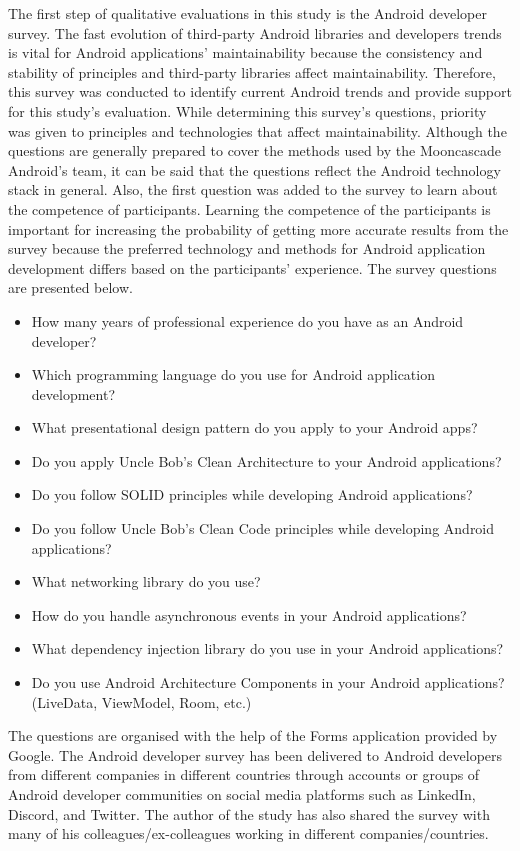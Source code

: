 The first step of qualitative evaluations in this study is the Android developer survey. The fast evolution of third-party Android libraries and developers trends is vital for Android applications' maintainability because the consistency and stability of principles and third-party libraries affect maintainability. Therefore, this survey was conducted to identify current Android trends and provide support for this study's evaluation. While determining this survey's questions, priority was given to principles and technologies that affect maintainability. Although the questions are generally prepared to cover the methods used by the Mooncascade Android's team, it can be said that the questions reflect the Android technology stack in general. Also, the first question was added to the survey to learn about the competence of participants. Learning the competence of the participants is important for increasing the probability of getting more accurate results from the survey because the preferred technology and methods for Android application development differs based on the participants’ experience. The survey questions are presented below. 
\begin{itemize}
    \item How many years of professional experience do you have as an Android developer?
    \item Which programming language do you use for Android application development?
    \item What presentational design pattern do you apply to your Android apps?
    \item Do you apply Uncle Bob's Clean Architecture to your Android applications?
    \item Do you follow SOLID principles while developing Android applications?
    \item Do you follow Uncle Bob's Clean Code principles while developing Android applications?
    \item What networking library do you use?
    \item How do you handle asynchronous events in your Android applications?
    \item What dependency injection library do you use in your Android applications?
    \item Do you use Android Architecture Components in your Android applications? (LiveData, ViewModel, Room, etc.)
\end{itemize}
The questions are organised with the help of the Forms application provided by Google. The Android developer survey has been delivered to Android developers from different companies in different countries through accounts or groups of Android developer communities on social media platforms such as LinkedIn, Discord, and Twitter. The author of the study has also shared the survey with many of his colleagues/ex-colleagues working in different companies/countries.